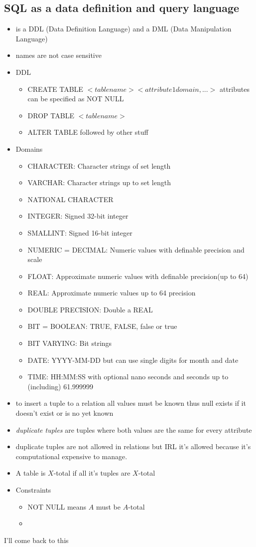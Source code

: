 \documentclass[10pt,a4paper]{article}
\begin{document}
	\subsection{SQL as a data definition and query language}
		\begin{itemize}
			\item is a DDL (Data Definition Language) and a DML (Data Manipulation Language)
			\item names are not case sensitive
			\item DDL
			\begin{itemize}
				\item CREATE TABLE $<table name> <attribute1 domain, ...>$ attributes can be specified as NOT NULL
				\item DROP TABLE $<table name>$
				\item ALTER TABLE followed by other stuff
			\end{itemize}
			\item Domains
			\begin{itemize}
				\item CHARACTER: Character strings of set length
				\item VARCHAR: Character strings up to set length
				\item NATIONAL CHARACTER
				\item INTEGER: Signed 32-bit integer
				\item SMALLINT: Signed 16-bit integer
				\item NUMERIC = DECIMAL: Numeric values with definable precision and scale
				\item FLOAT: Approximate numeric values with definable precision(up to 64)
				\item REAL: Approximate numeric values up to 64 precision
				\item DOUBLE PRECISION: Double a REAL
				\item BIT = BOOLEAN: TRUE, FALSE, false or true
				\item BIT VARYING: Bit strings
				\item DATE: YYYY-MM-DD but can use single digits for month and date
				\item TIME: HH:MM:SS with optional nano seconds and seconds up to (including) 61.999999
			\end{itemize}
			\item to insert a tuple to a relation all values must be known thus null exists if it doesn't exist or is no yet known
			\item \textit{duplicate tuples} are tuples where both values are the same for every attribute
			\item duplicate tuples are not allowed in relations but IRL it's allowed because it's computational expensive to manage.
			\item A table is $X$-total if all it's tuples are $X$-total
			\item Constraints
			\begin{itemize}
				\item NOT NULL means $A$ must be $A$-total
				\item 
			\end{itemize}			
		\end{itemize}
		I'll come back to this
\end{document}
